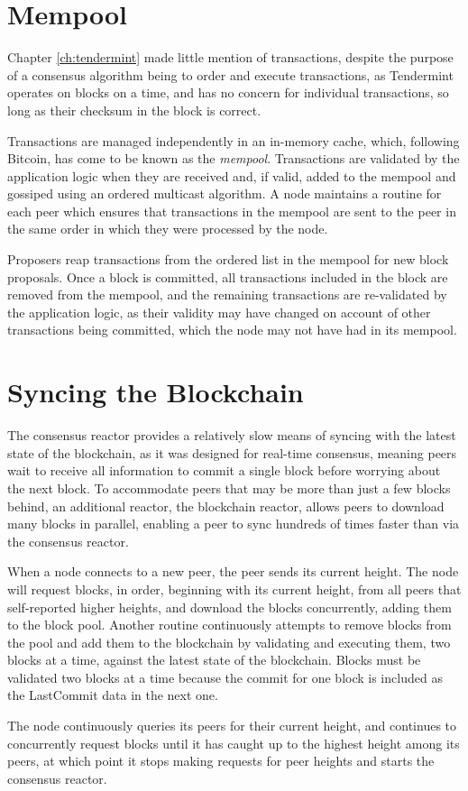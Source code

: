 \section{Mempool}

Chapter \ref{ch:tendermint} made little mention of transactions, 
despite the purpose of a consensus algorithm being to order and execute transactions,
as Tendermint operates on blocks on a time, and has no concern for individual transactions,
so long as their checksum in the block is correct.

Transactions are managed independently in an in-memory cache, 
which, following Bitcoin, has come to be known as the \emph{mempool}.
Transactions are validated by the application logic when they are received and, if valid, 
added to the mempool and gossiped using an ordered multicast algorithm.
A node maintains a routine for each peer which ensures that transactions 
in the mempool are sent to the peer in the same order in which they were processed by the node.

Proposers reap transactions from the ordered list in the mempool for new block proposals.
Once a block is committed, all transactions included in the block are removed from the mempool,
and the remaining transactions are re-validated by the application logic,
as their validity may have changed on account of other transactions being committed, 
which the node may not have had in its mempool.

\section{Syncing the Blockchain}

The consensus reactor provides a relatively slow means of syncing with the latest state of the blockchain,
as it was designed for real-time consensus,
meaning peers wait to receive all information to commit a single block before worrying about the next block.
To accommodate peers that may be more than just a few blocks behind, 
an additional reactor, the blockchain reactor, allows peers to download many blocks in parallel,
enabling a peer to sync hundreds of times faster than via the consensus reactor.

When a node connects to a new peer, the peer sends its current height.
The node will request blocks, in order, beginning with its current height,
from all peers that self-reported higher heights, and download the blocks concurrently, adding them to the block pool.
Another routine continuously attempts to remove blocks from the pool and add them to the blockchain by validating and executing them, 
two blocks at a time, against the latest state of the blockchain.
Blocks must be validated two blocks at a time because the commit for one block is included as the LastCommit data in the next one.

The node continuously queries its peers for their current height, 
and continues to concurrently request blocks until it has caught up to the highest height among its peers, 
at which point it stops making requests for peer heights and starts the consensus reactor.

